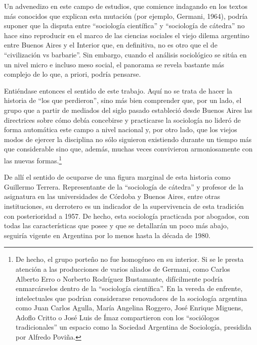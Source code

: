 Un advenedizo en este campo de estudios, que comience indagando en los textos más conocidos que explican esta mutación (por ejemplo, Germani, 1964), podría suponer que la disputa entre ``sociología científica'' y ``sociología de cátedra'' no hace sino reproducir en el marco de las ciencias sociales el viejo dilema argentino entre Buenos Aires y el Interior que, en definitiva, no es otro que el de ``civilización vs barbarie''. Sin embargo, cuando el análisis sociológico se sitúa en un nivel micro e incluso meso social, el panorama se revela bastante más complejo de lo que, a priori, podría pensarse.

Entiéndase entonces el sentido de este trabajo. Aquí no se trata de hacer la historia de ``los que perdieron'', sino más bien comprender que, por un lado, el grupo que a partir de mediados del siglo pasado estableció desde Buenos Aires las directrices sobre cómo debía concebirse y practicarse la sociología no lideró de forma automática este campo a nivel nacional y, por otro lado, que los viejos modos de ejercer la disciplina no sólo siguieron existiendo durante un tiempo más que considerable sino que, además, muchas veces convivieron armoniosamente con las nuevas formas.\footnote{De hecho, el grupo porteño no fue homogéneo en su interior. Si se le presta atención a las producciones de varios aliados de Germani, como Carlos Alberto Erro o Norberto Rodríguez Bustamante, difícilmente podría enmarcárselos dentro de la ``sociología científica''. En la vereda de enfrente, intelectuales que podrían considerarse renovadores de la sociología argentina como Juan Carlos Agulla, María Angelina Roggero, José Enrique Miguens, Adoflo Critto o José Luis de Ímaz compartieron con los ``sociólogos tradicionales'' un espacio como la Sociedad Argentina de Sociología, presidida por Alfredo Poviña.}

De allí el sentido de ocuparse de una figura marginal de esta historia como Guillermo Terrera. Representante de la ``sociología de cátedra'' y profesor de la asignatura en las universidades de Córdoba y Buenos Aires, entre otras instituciones, su derrotero es un indicador de la supervivencia de esta tradición con posterioridad a 1957. De hecho, esta sociología practicada por abogados, con todas las características que posee y que se detallarán un poco más abajo, seguiría vigente en Argentina por lo menos hasta la década de 1980.

